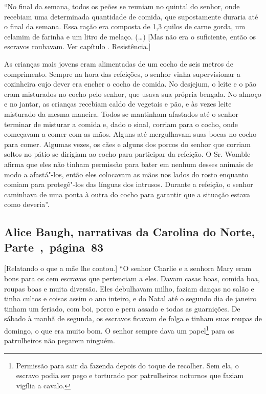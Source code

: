 ``No final da semana, todos os peões se reuniam no quintal do senhor,
onde recebiam uma determinada quantidade de comida, que supostamente
duraria até o final da semana. Essa ração era composta de 1,3 quilos de
carne gorda, um celamim de farinha e um litro de melaço. (\ldots{})
{[}Mas não era o suficiente, então os escravos roubavam. Ver capítulo .
Resistência.{]}

As crianças mais jovens eram alimentadas de um cocho de seis metros de
comprimento. Sempre na hora das refeições, o senhor vinha supervisionar
a cozinheira cujo dever era encher o cocho de comida. No desjejum, o
leite e o pão eram misturados no cocho pelo senhor, que usava sua
própria bengala. No almoço e no jantar, as crianças recebiam caldo de
vegetais e pão, e às vezes leite misturado da mesma maneira. Todos se
mantinham afastados até o senhor terminar de misturar a comida e, dado o
sinal, corriam para o cocho, onde começavam a comer com as mãos. Alguns
até mergulhavam suas bocas no cocho para comer. Algumas vezes, os cães e
alguns dos porcos do senhor que corriam soltos no pátio se dirigiam ao
cocho para participar da refeição. O Sr. Womble afirma que eles não
tinham permissão para bater em nenhum desses animais de modo a
afastá"-los, então eles colocavam as mãos nos lados do rosto enquanto
comiam para protegê"-los das línguas dos intrusos. Durante a refeição, o
senhor caminhava de uma ponta à outra do cocho para garantir que a
situação estava como deveria''.

\subsection{Alice Baugh, narrativas da Carolina do Norte, Parte~,~página~83}

{[}Relatando o que a mãe lhe contou.{]} ``O senhor Charlie e a senhora Mary eram bons para os cem escravos que pertenciam a eles. Davam casas boas, comida boa, roupas boas e muita
diversão. Eles debulhavam milho, faziam danças no salão e tinha cultos e
coisas assim o ano inteiro, e do Natal até o segundo dia de janeiro
tinham um feriado, com boi, porco e peru assado e todas as guarnições.
De sábado à manhã de segunda, os escravos ficavam de folga e tinham suas
roupas de domingo, o que era muito bom. O senhor sempre dava um papel\footnote{Permissão para sair
da fazenda depois do toque de recolher. Sem ela, o escravo podia ser
pego e torturado por patrulheiros noturnos que faziam vigília a
cavalo.} para os patrulheiros não pegarem ninguém.


